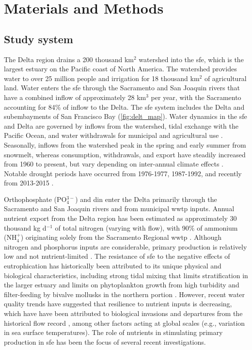 \documentclass[journal = esthag, manuscript = article]{achemso}\usepackage[]{graphicx}\usepackage[]{color}
\begin{document}
\section{Materials and Methods}

\subsection{Study system}

The Delta region drains a 200 thousand km$^2$ watershed into the \ac{sfe}, which is the largest estuary on the Pacific coast of North America.  The watershed provides water to over 25 million people and irrigation for 18 thousand km$^2$ of agricultural land.  Water enters the \ac{sfe} through the Sacramento and San Joaquin rivers that have a combined inflow of approximately 28 km$^3$ per year, with the Sacramento accounting for 84\% of inflow to the Delta.  The \ac{sfe} system includes the Delta and subembayments of San Francisco Bay (\cref{fig:delt_map}).  Water dynamics in the \ac{sfe} and Delta are governed by inflows from the watershed, tidal exchange with the Pacific Ocean, and water withdrawals for municipal and agricultural use \cite{Jassby00}.  Seasonally, inflows from the watershed peak in the spring and early summer from snowmelt, whereas consumption, withdrawals, and export have steadily increased from 1960 to present, but vary depending on inter-annual climate effects \cite{Cloern12b}. Notable drought periods have occurred from 1976-1977, 1987-1992, and recently from 2013-2015 \cite{Cloern15}.

Orthophosphate (PO$_4^{3-}$) and \ac{din} enter the Delta primarily through the Sacramento and San Joaquin rivers and from municipal \ac{wwtp} inputs.  Annual nutrient export from the Delta region has been estimated as approximately 30 thousand kg d$^{-1}$ of total nitrogen (varying with flow\cite{Novick15}), with 90\% of ammonium (NH$_4^{+}$) originating solely from the Sacramento Regional \ac{wwtp} \cite{Jassby08}.  Although nitrogen and phosphorus inputs are considerable, primary production is relatively low and not nutrient-limited \cite{Jassby02,Kimmerer12}.  The resistance of \ac{sfe} to the negative effects of eutrophication has historically been attributed to its unique physical and biological characteristics, including strong tidal mixing that limits stratification in the larger estuary \cite{Cloern96,Thompson08} and limits on phytoplankton growth from high turbidity and filter-feeding by bivalve mollusks in the northern portion \cite{Thompson08,Crauder16}.  However, recent water quality trends have suggested that resilience to nutrient inputs is decreasing\cite{Lehman05,Cloern07,Lehman10}, which have have been attributed to biological invasions \cite{Cohen98} and departures from the historical flow record \cite{Enright09,Cloern12b}, among other factors acting at global scales (e.g., variation in sea surface temperatures).\cite{Cloern07}  The role of nutrients in stimulating primary production in \ac{sfe} has been the focus of several recent investigations.\cite{Dugdale07,Parker12,Glibert14}
\end{document}
